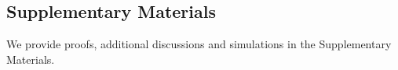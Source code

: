 \vspace{-3mm}
\subsection*{Supplementary Materials}
\vspace{-3mm}

We provide proofs, additional discussions and simulations in the Supplementary Materials.


\vspace{-3mm}





\newpage


